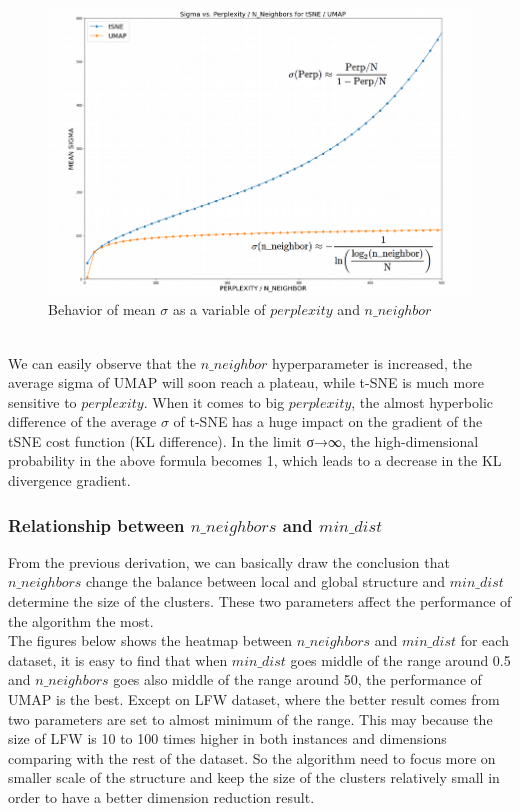 \begin{enumerate}[1)]
\begin{figure}[ht]

\centering
\includegraphics[width=12cm,height=7cm\textwidth]{images/image_sigmma.png}
\caption{Behavior of mean $\sigma$ as a variable of $perplexity$ and $n\_neighbor$}
\label{fig:label}
\end{figure}\\

We can easily observe that the $n\_neighbor$ hyperparameter is increased, the average sigma of UMAP will soon reach a plateau, while t-SNE is much more sensitive to $perplexity$. When it comes to big $perplexity$, the almost hyperbolic difference of the average $\sigma$ of t-SNE has a huge impact on the gradient of the tSNE cost function (KL difference). In the limit σ→∞, the high-dimensional probability in the above formula becomes 1, which leads to a decrease in the KL divergence gradient.\\

\subsubsection{Relationship between $n\_neighbors$ and $min\_dist$}

From the previous derivation, we can basically draw the conclusion that $n\_neighbors$ change the balance between local and global structure and $min\_dist$ determine the size of the clusters. These two parameters affect the performance of the algorithm the most.\\

The figures below shows the heatmap between $n\_neighbors$ and $min\_dist$ for each dataset, it is easy to find that when $min\_dist$ goes middle of the range around 0.5 and $n\_neighbors$ goes also middle of the range around 50, the performance of UMAP is the best. Except on LFW dataset, where the better result comes from two parameters are set to almost minimum of the range. This may because the size of LFW is 10 to 100 times higher in both instances and dimensions comparing with the rest of the dataset. So the algorithm need to focus more on smaller scale of the structure and keep the size of the clusters relatively small in order to have a better dimension reduction result.  


\end{enumerate}

